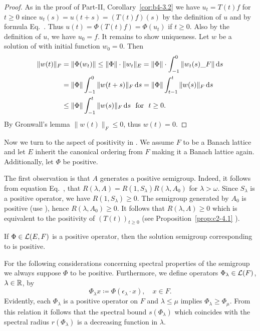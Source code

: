 \begin{proof}
As in the proof of Part-II, Corollary~\ref{cor:b4-3.2} we have $u_t = T(t)f$ for $t \geq 0$ since $u_t(s) = u(t+s) = (T(t)f)(s)$ by the definition of\/ $u$ and by formula Eq.~.
Thus $u(t) = \Phi(T(t)f) = \Phi(u_t)$ if\/ $t \geq 0$.
Also by the definition of\/ $u$, we have $u_{0} = f$.
It remains to show uniqueness.
Let $w$ be a solution of  with initial function $w_{0} = 0$.
Then
\begin{align*}
\|w(t)\|_F & = \|\Phi(w_{t})\| \leq \|\Phi\| \cdot  \|w_{t}\|_{E} =  \|\Phi\| \cdot \int_{-1}^{0} \|w_{t}(s)\_{F}\| \ds \\
&=  \|\Phi\| \int_{-1}^0 \|w(t+s)\|_{F} \ds = \|\Phi\| \int_{t-1}^{t} \|w(s)\|_{F} \ds \\
&\leq \|\Phi\| \int_{-1}^{t} \|w(s)\|_{F} \ds \ \text{ for } \ t \geq 0 .
\end{align*}
By Gronwall's lemma $\|w(t)\|_F \leq 0$, thus $w(t) = 0$.
\end{proof}
Now we turn to the aspect of positivity in . We assume $F$ to be a Banach lattice and let $E$ inherit the canonical ordering from $F$ making it a Banach lattice again. Additionally, let $\Phi$ be positive.

The first observation is that $A$ generates a positive semigroup.
Indeed, it follows from equation Eq.~, that $R(\lambda,A) = R(1,S_\lambda)R(\lambda,A_{0})$ for $\lambda > \omega$. Since $S_\lambda$ is a positive operator, we have $R(1,S_\lambda) \geq 0$.
The semigroup generated by $A_{0}$ is positive (use ), hence $R(\lambda,A_{0}) \geq 0$.
It follows that $R(\lambda,A) \geq 0$ which is equivalent to the positivity of\/ $(T(t))_{t \geq 0}$ (see Proposition~\ref{prop:c2-4.1} ).
\begin{proposition}\label{prop:c4-3.3}
If\/ $\Phi \in \mathcal{L}(E,F)$ is a positive operator, then the solution semigroup corresponding to  is positive.
\end{proposition}
For the following considerations concerning spectral properties of the semigroup we always suppose $\Phi$ to be positive. Furthermore, we define operators $\Phi_{\lambda} \in \mathcal{L}(F)$, $\lambda \in \mathbb{R}$, by
\begin{equation}\label{eq:c4-3.6}
\Phi_\lambda x \coloneqq \Phi(\epsilon_{\lambda} \cdot x), \quad x \in F .
\end{equation}
Evidently, each $\Phi_\lambda$ is a positive operator on $F$ and $\lambda \leq \mu$ implies $\Phi_{\lambda} \geq \Phi_{\mu}$.
From this relation it follows that the spectral bound $s(\Phi_{\lambda})$ which coincides with the spectral radius $r(\Phi_{\lambda})$ is a decreasing function in $\lambda$.

